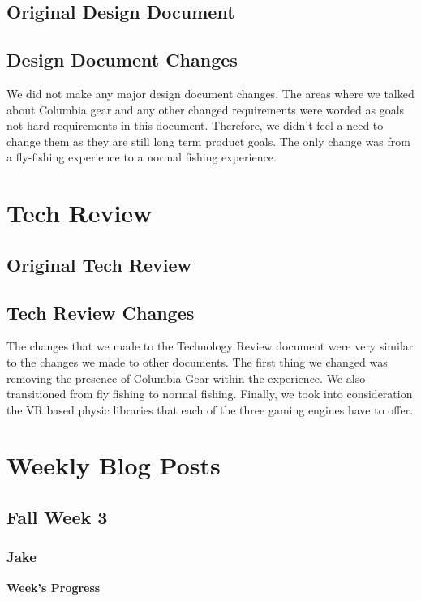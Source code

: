 \documentclass[10pt,journal,compsoc,onecolumn, draftclsnofoot]{IEEEtran}
\begin{document}
\subsection{Original Design Document}


\subsection{Design Document Changes}
We did not make any major design document changes. The areas where we talked about Columbia gear and any other changed requirements were worded as goals not hard requirements in this document. Therefore, we didn't feel a need to change them as they are still long term product goals. The only change was from a fly-fishing experience to a normal fishing experience.

\section{Tech Review}
\subsection{Original Tech Review}


\subsection{Tech Review Changes}
The changes that we made to the Technology Review document were very similar to the changes we made to other documents. The first thing we changed was removing the presence of Columbia Gear within the experience. We also transitioned from fly fishing to normal fishing. Finally, we took into consideration the VR based physic libraries that each of the three gaming engines have to offer. 

\section{Weekly Blog Posts}

\subsection{Fall Week 3}
\subsubsection{Jake}
\noindent \textbf{Week's Progress}
\end{document}

